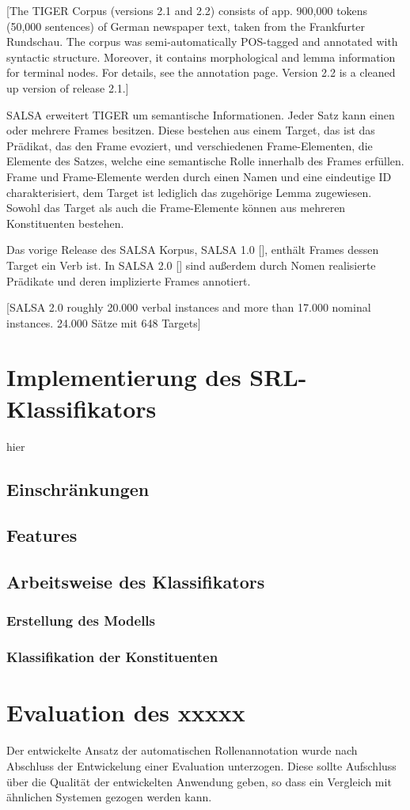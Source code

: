 \documentclass[12pt]{article}
\begin{document}
[The TIGER Corpus (versions 2.1 and 2.2) consists of app. 900,000 tokens (50,000 sentences) of German newspaper text, taken from the Frankfurter Rundschau. The corpus was semi-automatically POS-tagged and annotated with syntactic structure. Moreover, it contains morphological and lemma information for terminal nodes. For details, see the annotation page. Version 2.2 is a cleaned up version of release 2.1.]

SALSA erweitert TIGER um semantische Informationen. Jeder Satz kann einen oder mehrere Frames besitzen. Diese bestehen aus einem Target, das ist das Prädikat, das den Frame evoziert, und verschiedenen Frame-Elementen, die Elemente des Satzes, welche eine semantische Rolle innerhalb des Frames erfüllen. Frame und Frame-Elemente werden durch einen Namen und eine eindeutige ID charakterisiert, dem Target ist lediglich das zugehörige Lemma zugewiesen. Sowohl das Target als auch die Frame-Elemente können aus mehreren Konstituenten bestehen.

Das vorige Release des SALSA Korpus, SALSA 1.0 [\cite{burchardt_salsa_2006}], enthält Frames dessen Target ein Verb ist. In SALSA 2.0 [\cite{rehbein_adding_2012}] sind außerdem durch Nomen realisierte Prädikate und deren implizierte Frames annotiert. 

[SALSA 2.0 roughly 20.000 verbal instances and more than 17.000 nominal instances. 24.000 Sätze mit 648 Targets]
\section{Implementierung des SRL-Klassifikators}
hier
\subsection{Einschränkungen}
\subsection{Features}
\subsection{Arbeitsweise des Klassifikators}
\subsubsection{Erstellung des Modells}
\subsubsection{Klassifikation der Konstituenten}
\section{Evaluation des xxxxx} %

Der entwickelte Ansatz der automatischen Rollenannotation wurde nach Abschluss
der Entwickelung einer Evaluation unterzogen. Diese sollte Aufschluss über die
Qualität der entwickelten Anwendung geben, so dass ein Vergleich mit ähnlichen
Systemen gezogen werden kann.

\newpage


\end{document}

